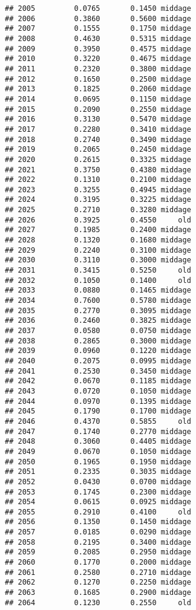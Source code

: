\documentclass[
]{article}
\begin{document}
\begin{verbatim}
## 2005         0.0765       0.1450 middage
## 2006         0.3860       0.5600 middage
## 2007         0.1555       0.1750 middage
## 2008         0.4630       0.5315 middage
## 2009         0.3950       0.4575 middage
## 2010         0.3220       0.4675 middage
## 2011         0.2320       0.3800 middage
## 2012         0.1650       0.2500 middage
## 2013         0.1825       0.2060 middage
## 2014         0.0695       0.1150 middage
## 2015         0.2090       0.2550 middage
## 2016         0.3130       0.5470 middage
## 2017         0.2280       0.3410 middage
## 2018         0.2740       0.3490 middage
## 2019         0.2065       0.2450 middage
## 2020         0.2615       0.3325 middage
## 2021         0.3750       0.4380 middage
## 2022         0.1310       0.2100 middage
## 2023         0.3255       0.4945 middage
## 2024         0.3195       0.3225 middage
## 2025         0.2710       0.3280 middage
## 2026         0.3925       0.4550     old
## 2027         0.1985       0.2400 middage
## 2028         0.1320       0.1680 middage
## 2029         0.2240       0.3100 middage
## 2030         0.3110       0.3000 middage
## 2031         0.3415       0.5250     old
## 2032         0.1050       0.1400     old
## 2033         0.0880       0.1465 middage
## 2034         0.7600       0.5780 middage
## 2035         0.2770       0.3095 middage
## 2036         0.2460       0.3825 middage
## 2037         0.0580       0.0750 middage
## 2038         0.2865       0.3000 middage
## 2039         0.0960       0.1220 middage
## 2040         0.2075       0.0995 middage
## 2041         0.2530       0.3450 middage
## 2042         0.0670       0.1185 middage
## 2043         0.0720       0.1050 middage
## 2044         0.0970       0.1395 middage
## 2045         0.1790       0.1700 middage
## 2046         0.4370       0.5855     old
## 2047         0.1740       0.2770 middage
## 2048         0.3060       0.4405 middage
## 2049         0.0670       0.1050 middage
## 2050         0.1965       0.1950 middage
## 2051         0.2335       0.3035 middage
## 2052         0.0430       0.0700 middage
## 2053         0.1745       0.2300 middage
## 2054         0.0615       0.0925 middage
## 2055         0.2910       0.4100     old
## 2056         0.1350       0.1450 middage
## 2057         0.0185       0.0290 middage
## 2058         0.2195       0.3400 middage
## 2059         0.2085       0.2950 middage
## 2060         0.1770       0.2000 middage
## 2061         0.2580       0.2710 middage
## 2062         0.1270       0.2250 middage
## 2063         0.1685       0.2900 middage
## 2064         0.1230       0.2550     old

\end{verbatim}
\end{document}
